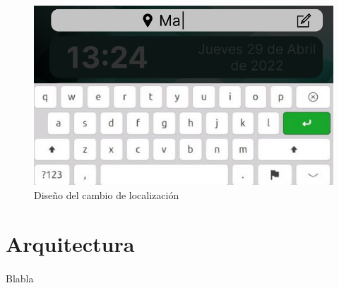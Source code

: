 \begin{figure}[H]
	\centering
	\includegraphics[width=0.75\linewidth]{imgs/figma-location}
	\caption[Diseño del cambio de localización]{Diseño del cambio de localización}
	\label{fig:design_location}
\end{figure}

\section{Arquitectura}

\paragraph{}Blabla

